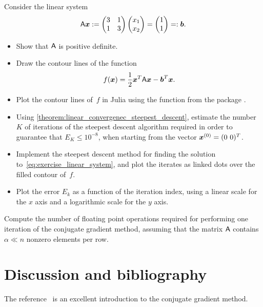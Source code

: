 \begin{compexercise}
    Consider the linear system
    \begin{equation}
        \label{eq:exercise_linear_system}
        \mathsf A \mathbf{\boldsymbol{x}} :=
        \begin{pmatrix}
            3 & 1 \\ 1 & 3
        \end{pmatrix}
        \begin{pmatrix}
            x_1 \\
            x_2
        \end{pmatrix}
        =
        \begin{pmatrix}
            1 \\
            1
        \end{pmatrix} =: \mathbf{\boldsymbol{b}}.
    \end{equation}
    \begin{itemize}
        \item
            Show that $\mathsf A$ is positive definite.

        \item
            Draw the contour lines of the function
            \[
                f(\mathbf{\boldsymbol{x}}) = \frac{1}{2} \mathbf{\boldsymbol{x}}^T \mathsf A \mathbf{\boldsymbol{x}} - \mathbf{\boldsymbol{b}}^T \mathbf{\boldsymbol{x}}.
            \]

        \item
            Plot the contour lines of~$f$ in Julia using the function  from the package .

        \item
            Using \cref{theorem:linear_convergenec_steepest_descent},
            estimate the number~$K$ of iterations of the steepest descent algorithm required in order to guarantee that $E_K \leq 10^{-8}$,
            when starting from the vector $\mathbf{\boldsymbol{x}}^{(0)} = (0~0)^T$.

        \item
            Implement the steepest descent method for finding the solution to~\eqref{eq:exercise_linear_system},
            and plot the iterates as linked dots over the filled contour of~$f$.

        \item
            Plot the error $E_k$ as a function of the iteration index,
            using a linear scale for the $x$ axis and a logarithmic scale for the $y$ axis.
    \end{itemize}
\end{compexercise}

\begin{exercise}
    Compute the number of floating point operations required for performing one iteration of the conjugate gradient method,
    assuming that the matrix $\mathsf A$ contains $\alpha \ll n$ nonzero elements per row.
\end{exercise}

\section{Discussion and bibliography}%

The reference~\cite{shewchuk1994introduction} is an excellent introduction to the conjugate gradient method.
